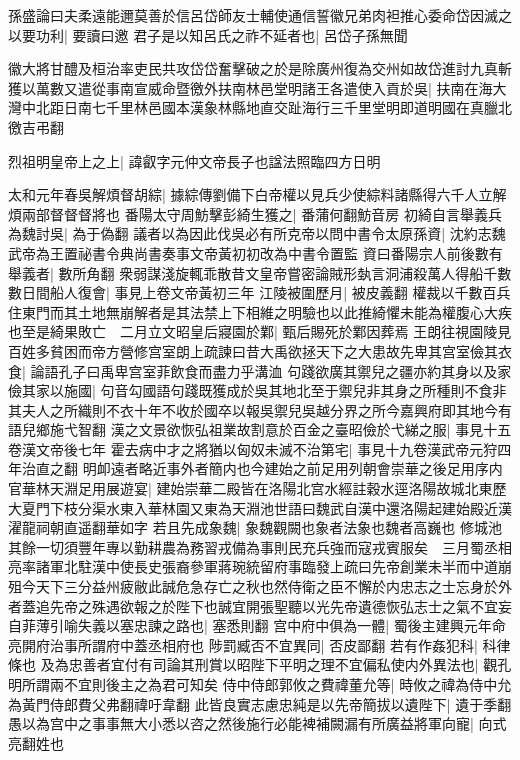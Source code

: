 孫盛論曰夫柔遠能邇莫善於信呂岱師友士輔使通信誓徽兄弟肉袒推心委命岱因滅之以要功利|{
	要讀曰邀}
君子是以知呂氏之祚不延者也|{
	呂岱子孫無聞}


徽大將甘醴及桓治率吏民共攻岱岱奮擊破之於是除廣州復為交州如故岱進討九真斬獲以萬數又遣從事南宣威命暨徼外扶南林邑堂明諸王各遣使入貢於吳|{
	扶南在海大灣中北距日南七千里林邑國本漢象林縣地直交趾海行三千里堂明即道明國在真臘北徼吉弔翻}


烈祖明皇帝上之上|{
	諱叡字元仲文帝長子也諡法照臨四方日明}


太和元年春吳解煩督胡綜|{
	據綜傳劉備下白帝權以見兵少使綜料諸縣得六千人立解煩兩部督督督將也}
番陽太守周魴擊彭綺生獲之|{
	番蒲何翻魴音房}
初綺自言舉義兵為魏討吳|{
	為于偽翻}
議者以為因此伐吳必有所克帝以問中書令太原孫資|{
	沈約志魏武帝為王置祕書令典尚書奏事文帝黃初初改為中書令置監}
資曰番陽宗人前後數有舉義者|{
	數所角翻}
衆弱謀淺旋輒乖散昔文皇帝嘗密論賊形埶言洞浦殺萬人得船千數數日間船人復會|{
	事見上卷文帝黃初三年}
江陵被圍歷月|{
	被皮義翻}
權裁以千數百兵住東門而其土地無崩解者是其法禁上下相維之明驗也以此推綺懼未能為權腹心大疾也至是綺果敗亡　二月立文昭皇后寢園於鄴|{
	甄后賜死於鄴因葬焉}
王朗往視園陵見百姓多貧困而帝方營修宫室朗上疏諫曰昔大禹欲拯天下之大患故先卑其宫室儉其衣食|{
	論語孔子曰禹卑宫室菲飲食而盡力乎溝洫}
句踐欲廣其禦兒之疆亦約其身以及家儉其家以施國|{
	句音勾國語句踐既獲成於吳其地北至于禦兒非其身之所種則不食非其夫人之所織則不衣十年不收於國卒以報吳禦兒吳越分界之所今嘉興府即其地今有語兒鄉施弋智翻}
漢之文景欲恢弘祖業故割意於百金之臺昭儉於弋綈之服|{
	事見十五卷漢文帝後七年}
霍去病中才之將猶以匈奴未滅不治第宅|{
	事見十九卷漢武帝元狩四年治直之翻}
明卹遠者略近事外者簡内也今建始之前足用列朝會崇華之後足用序内官華林天淵足用展遊宴|{
	建始崇華二殿皆在洛陽北宫水經註穀水逕洛陽故城北東歷大夏門下枝分渠水東入華林園又東為天淵池世語曰魏武自漢中還洛陽起建始殿近漢濯龍祠朝直遥翻華如字}
若且先成象魏|{
	象魏觀闕也象者法象也魏者高巍也}
修城池其餘一切須豐年專以勤耕農為務習戎備為事則民充兵強而寇戎賓服矣　三月蜀丞相亮率諸軍北駐漢中使長史張裔參軍蔣琬統留府事臨發上疏曰先帝創業未半而中道崩殂今天下三分益州疲敝此誠危急存亡之秋也然侍衛之臣不懈於内忠志之士忘身於外者蓋追先帝之殊遇欲報之於陛下也誠宜開張聖聽以光先帝遺德恢弘志士之氣不宜妄自菲薄引喻失義以塞忠諫之路也|{
	塞悉則翻}
宫中府中俱為一體|{
	蜀後主建興元年命亮開府治事所謂府中蓋丞相府也}
陟罰臧否不宜異同|{
	否皮鄙翻}
若有作姦犯科|{
	科律條也}
及為忠善者宜付有司論其刑賞以昭陛下平明之理不宜偏私使内外異法也|{
	觀孔明所謂兩不宜則後主之為君可知矣}
侍中侍郎郭攸之費禕董允等|{
	時攸之禕為侍中允為黃門侍郎費父弗翻禕吁韋翻}
此皆良實志慮忠純是以先帝簡拔以遺陛下|{
	遺于季翻}
愚以為宫中之事事無大小悉以咨之然後施行必能裨補闕漏有所廣益將軍向寵|{
	向式亮翻姓也}
